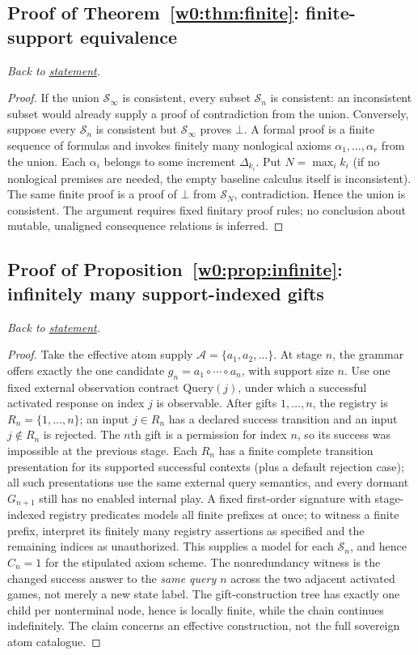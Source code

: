 \documentclass[11pt,letterpaper]{article}
\theoremstyle{definition}\newtheorem{definition}[theorem]{Definition}\newtheorem{example}[theorem]{Example}
\theoremstyle{remark}\newtheorem{remark}[theorem]{Remark}
\newcommand{\Stage}{\mathcal{S}}
\newcommand{\Abs}{\mathcal{A}}
\begin{document}
\subsection{Proof of Theorem~\ref{w0:thm:finite}: finite-support equivalence}\label{w0:pr:finite}
\textit{Back to \hyperref[w0:thm:finite]{statement}.}
\begin{proof}
If the union $\Stage_\infty$ is consistent, every subset $\Stage_n$ is consistent: an inconsistent subset would already supply a proof of contradiction from the union. Conversely, suppose every $\Stage_n$ is consistent but $\Stage_\infty$ proves $\bot$. A formal proof is a finite sequence of formulas and invokes finitely many nonlogical axioms $\alpha_1,\ldots,\alpha_r$ from the union. Each $\alpha_i$ belongs to some increment $\Delta_{k_i}$. Put $N=\max_i k_i$ (if no nonlogical premises are needed, the empty baseline calculus itself is inconsistent). The same finite proof is a proof of $\bot$ from $\Stage_N$, contradiction. Hence the union is consistent. The argument requires fixed finitary proof rules; no conclusion about mutable, unaligned consequence relations is inferred.
\end{proof}



\subsection{Proof of Proposition~\ref{w0:prop:infinite}: infinitely many support-indexed gifts}\label{w0:pr:infinite}
\textit{Back to \hyperref[w0:prop:infinite]{statement}.}
\begin{proof}
Take the effective atom supply $\Abs=\{a_1,a_2,\ldots\}$. At stage $n$, the grammar offers exactly the one candidate $g_n=a_1\circ\cdots\circ a_n$, with support size $n$. Use one fixed external observation contract $\mathrm{Query}(j)$, under which a successful activated response on index $j$ is observable. After gifts $1,\ldots,n$, the registry is $R_n=\{1,\ldots,n\}$; an input $j\in R_n$ has a declared success transition and an input $j\notin R_n$ is rejected. The $n$th gift is a permission for index $n$, so its success was impossible at the previous stage. Each $R_n$ has a finite complete transition presentation for its supported successful contexts (plus a default rejection case); all such presentations use the same external query semantics, and every dormant $G_{n+1}$ still has no enabled internal play. A fixed first-order signature with stage-indexed registry predicates models all finite prefixes at once; to witness a finite prefix, interpret its finitely many registry assertions as specified and the remaining indices as unauthorized. This supplies a model for each $\Stage_n$, and hence $C_n=1$ for the stipulated axiom scheme. The nonredundancy witness is the changed success answer to the \emph{same query $n$} across the two adjacent activated games, not merely a new state label. The gift-construction tree has exactly one child per nonterminal node, hence is locally finite, while the chain continues indefinitely. The claim concerns an effective construction, not the full sovereign atom catalogue.
\end{proof}
\end{document}
